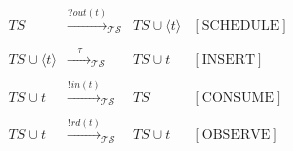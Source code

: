 \documentclass[presentation]{beamer}\mode<presentation>{\usetheme{AMSCesenaPurpleAndGold}}
\begin{document}
\begin{frame}
\begin{columns}
\begin{column}{.75\linewidth}
            \[\begin{array}{rclr}
                TS &\xrightarrow{?out(t)}_\mathcal{TS}& TS \cup \langle t \rangle & [\text{SCHEDULE}] \\
                \\
                TS \cup \langle t \rangle &\xrightarrow{\phantom{ab}\tau\phantom{ab}}_\mathcal{TS}& TS \cup t & [\text{INSERT}] \\
                \\
                TS \cup t &\xrightarrow{!in(t)}_\mathcal{TS}& TS & [\text{CONSUME}] \\
                \\
                TS \cup t &\xrightarrow{!rd(t)}_\mathcal{TS}& TS \cup t & [\text{OBSERVE}] \\
            \end{array}\]
        \end{column}
        \begin{column}{.25\linewidth}

\end{column}
\end{columns}
\end{frame}
\end{document}

